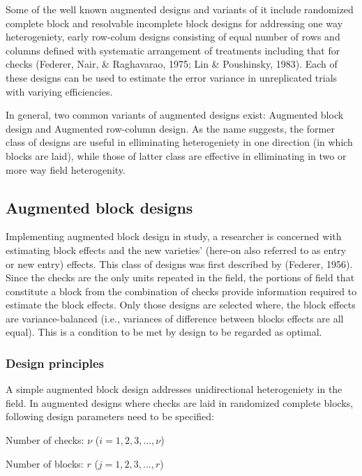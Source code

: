 \documentclass[12pt,oneside]{dukestatscithesis} %
\begin{document}
Some of the well known augmented designs and variants of it include randomized complete block and resolvable incomplete block designs for addressing one way heterogeniety, early row-colum designs consisting of equal number of rows and columns defined with systematic arrangement of treatments including that for checks (Federer, Nair, \& Raghavarao, 1975; Lin \& Poushinsky, 1983). Each of these designs can be used to estimate the error variance in unreplicated trials with variying efficiencies.

In general, two common variants of augmented designs exist: Augmented block design and Augmented row-column design. As the name suggests, the former class of designs are useful in elliminating heterogeniety in one direction (in which blocks are laid), while those of latter class are effective in elliminating in two or more way field heterogenity.

\hypertarget{aug-block-des}{%
\subsection{Augmented block designs}\label{aug-block-des}}

Implementing augmented block design in study, a researcher is concerned with estimating block effects and the new varieties' (here-on also referred to as entry or new entry) effects. This class of designs was first described by (Federer, 1956). Since the checks are the only units repeated in the field, the portions of field that constitute a block from the combination of checks provide information required to estimate the block effects. Only those designs are selected where, the block effects are variance-balanced (i.e., variances of difference between blocks effects are all equal). This is a condition to be met by design to be regarded as optimal.

\hypertarget{des-prin-aug-block}{%
\subsubsection{Design principles}\label{des-prin-aug-block}}

A simple augmented block design addresses unidirectional heterogeniety in the field. In augmented designs where checks are laid in randomized complete blocks, following design parameters need to be specified:

Number of checks: \(\nu\) (\(i = 1, 2, 3,..., \nu\))

Number of blocks: \(r\) (\(j = 1, 2, 3,..., r\))
\end{document}
